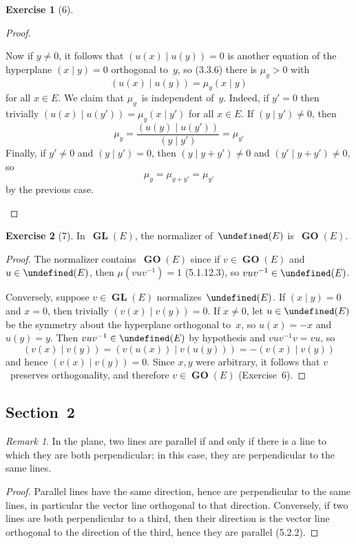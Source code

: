 \documentclass[letterpaper,12pt]{article}
\let\O\undefined %
\DeclareMathOperator{\GL}{\mathbf{GL}}
\DeclareMathOperator{\GO}{\mathbf{GO}}
\DeclareMathOperator{\O}{\mathbf{O}}
\newcommand{\inv}[1]{#1^{-1}}
\newcommand{\innerprod}[2]{({#1}\;|\;{#2})}
\theoremstyle{definition}
\newtheorem*{exer}{Exercise}
\theoremstyle{remark}
\newtheorem*{rmk}{Remark}
\begin{document}
\begin{exer}[6]
\begin{proof}
\begin{itemize}[itemsep=0pt]
Now if \(y\ne 0\), it follows that \(\innerprod{u(x)}{u(y)}=0\) is another equation of the hyperplane \(\innerprod{x}{y}=0\) orthogonal to~\(y\), so (3.3.6) there is \(\mu_y>0\) with
\[\innerprod{u(x)}{u(y)}=\mu_y\innerprod{x}{y}\]
for all \(x\in E\). We claim that \(\mu_y\)~is independent of~\(y\). Indeed, if \(y'=0\) then trivially \(\innerprod{u(x)}{u(y')}=\mu_y\innerprod{x}{y'}\) for all \(x\in E\). If \(\innerprod{y}{y'}\ne 0\), then
\[\mu_{y}=\frac{\innerprod{u(y)}{u(y')}}{\innerprod{y}{y'}}=\mu_{y'}\]
Finally, if \(y'\ne 0\) and \(\innerprod{y}{y'}=0\), then \(\innerprod{y}{y+y'}\ne 0\) and \(\innerprod{y'}{y+y'}\ne 0\), so
\[\mu_y=\mu_{y+y'}=\mu_{y'}\]
by the previous case.\qedhere
\end{itemize}
\end{proof}
\end{exer}

\begin{exer}[7]
In~\(\GL(E)\), the normalizer of~\(\O(E)\) is~\(\GO(E)\).
\end{exer}
\begin{proof}
The normalizer contains~\(\GO(E)\) since if \(v\in\GO(E)\) and \(u\in\O(E)\), then \(\mu(vu\inv{v})=1\) (5.1.12.3), so \(vu\inv{v}\in\O(E)\).

Conversely, suppose \(v\in\GL(E)\) normalizes~\(\O(E)\). If \(\innerprod{x}{y}=0\) and \(x=0\), then trivially \(\innerprod{v(x)}{v(y)}=0\). If \(x\ne 0\), let \(u\in\O(E)\) be the symmetry about the hyperplane orthogonal to~\(x\), so \(u(x)=-x\) and \(u(y)=y\). Then \(vu\inv{v}\in\O(E)\) by hypothesis and \(vu\inv{v}v=vu\), so
\[\innerprod{v(x)}{v(y)}=\innerprod{v(u(x))}{v(u(y))}=-\innerprod{v(x)}{v(y)}\]
and hence \(\innerprod{v(x)}{v(y)}=0\). Since \(x,y\) were arbitrary, it follows that \(v\)~preserves orthogonality, and therefore \(v\in\GO(E)\) (Exercise~6).
\end{proof}

\subsection*{Section~2}
\begin{rmk}
In the plane, two lines are parallel if and only if there is a line to which they are both perpendicular; in this case, they are perpendicular to the same lines.
\end{rmk}
\begin{proof}
Parallel lines have the same direction, hence are perpendicular to the same lines, in particular the vector line orthogonal to that direction. Conversely, if two lines are both perpendicular to a third, then their direction is the vector line orthogonal to the direction of the third, hence they are parallel (5.2.2).
\end{proof}
\end{document}
